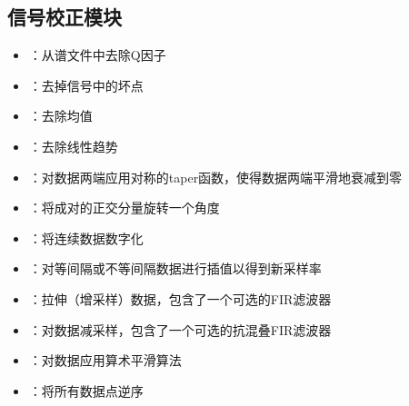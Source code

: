 \subsection*{信号校正模块}
\begin{itemize}
\item {}：从谱文件中去除Q因子
\item {}：去掉信号中的坏点
\item {}：去除均值
\item {}：去除线性趋势
\item {}：对数据两端应用对称的taper函数，使得数据两端平滑地衰减到零
\item {}：将成对的正交分量旋转一个角度
\item {}：将连续数据数字化
\item {}：对等间隔或不等间隔数据进行插值以得到新采样率
\item {}：拉伸（增采样）数据，包含了一个可选的FIR滤波器
\item {}：对数据减采样，包含了一个可选的抗混叠FIR滤波器
\item {}：对数据应用算术平滑算法
\item {}：将所有数据点逆序
\end{itemize}

\newpage
